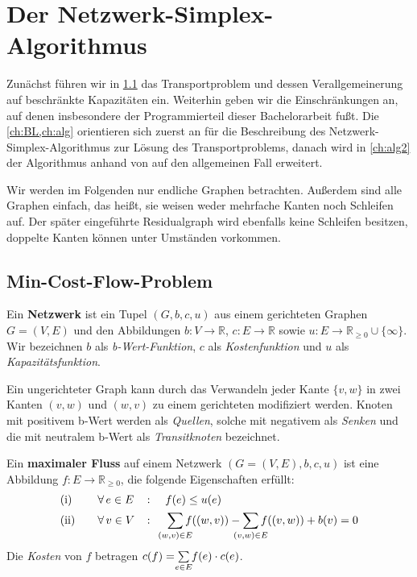 \chapter{Der Netzwerk-Simplex-Algorithmus}\label{ch:NSA}
Zunächst führen wir in \cref{ch:MCF} das Transportproblem und dessen Verallgemeinerung auf beschränkte Kapazitäten ein. Weiterhin geben wir die Einschränkungen an, auf denen insbesondere der Programmierteil dieser Bachelorarbeit fußt. Die \cref{ch:BL,ch:alg} orientieren sich zuerst an \cite[S. 291\,ff.]{NSAbook} für die Beschreibung des Netzwerk-Simplex-Algorithmus zur Lösung des Transportproblems, danach wird in \cref{ch:alg2} der Algorithmus anhand von \cite[S. 353\,ff.]{NSAbook} auf den allgemeinen Fall erweitert.

Wir werden im Folgenden nur endliche Graphen betrachten. Außerdem sind alle Graphen einfach, das heißt, sie weisen weder mehrfache Kanten noch Schleifen auf. Der später eingeführte Residualgraph wird ebenfalls keine Schleifen besitzen, doppelte Kanten können unter Umständen vorkommen.

\section{Min-Cost-Flow-Problem}\label{ch:MCF}
\begin{defn}Ein \textbf{Netzwerk} ist ein Tupel $(G,b,c,u)$ aus einem gerichteten Graphen $G = (V,E)$ und den Abbildungen $b \colon V\rightarrow\mathbb{R}$, $c \colon E\rightarrow\mathbb{R}$ sowie $u \colon E\rightarrow\mathbb{R}_{\geq 0}\cup \{\infty\}$. Wir bezeichnen $b$ als \emph{b-Wert-Funktion}, $c$ als \emph{Kostenfunktion} und $u$ als \emph{Kapazitätsfunktion}.\end{defn}
\begin{anm}Ein ungerichteter Graph kann durch das Verwandeln jeder Kante $\{v,w\}$ in zwei Kanten $(v,w)$ und $(w,v)$ zu einem gerichteten modifiziert werden. Knoten mit positivem b-Wert werden als \emph{Quellen}, solche mit negativem als \emph{Senken} und die mit neutralem b-Wert als \emph{Transitknoten} bezeichnet.\end{anm}

\begin{defn}\label{DefMaxFlow}Ein \textbf{maximaler Fluss} auf einem Netzwerk $(G=(V,E),b,c,u)$ ist eine Abbildung $f \colon E\rightarrow\mathbb{R}_{\geq 0}$, die folgende Eigenschaften erfüllt:
\begin{alignat}{3}
&\text{(i)}\quad&&\forall\,e\in E &&\colon\quad f(e)\leq u(e)\nonumber\\
&\text{(ii)}\quad&&\forall\,v\in V &&\colon\quad \sum_{\mathclap{(w,v)\in E}} f((w,v)) - \sum_{\mathclap{(v,w)\in E}} f((v,w)) + b(v) = 0\label{DefMaxFlowII}
\end{alignat}
Die \emph{Kosten} von $f$ betragen $c(f) = \sum\limits_{\mathclap{e\in E}} f(e)\cdot c(e)$.
\end{defn}

